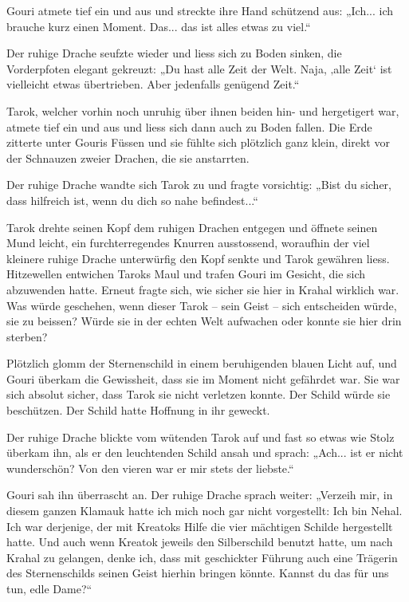 Gouri atmete tief ein und aus und streckte ihre Hand schützend aus: „Ich... ich brauche kurz einen Moment. Das... das ist alles etwas zu viel.“

Der ruhige Drache seufzte wieder und liess sich zu Boden sinken, die Vorderpfoten elegant gekreuzt: „Du hast alle Zeit der Welt. Naja, ‚alle Zeit‘ ist vielleicht etwas übertrieben. Aber jedenfalls genügend Zeit.“

Tarok, welcher vorhin noch unruhig über ihnen beiden hin- und hergetigert war, atmete tief ein und aus und liess sich dann auch zu Boden fallen. Die Erde zitterte unter Gouris Füssen und sie fühlte sich plötzlich ganz klein, direkt vor der Schnauzen zweier Drachen, die sie anstarrten.

Der ruhige Drache wandte sich Tarok zu und fragte vorsichtig: „Bist du sicher, dass hilfreich ist, wenn du dich so nahe befindest...“

Tarok drehte seinen Kopf dem ruhigen Drachen entgegen und öffnete seinen Mund leicht, ein furchterregendes Knurren ausstossend, woraufhin der viel kleinere ruhige Drache unterwürfig den Kopf senkte und Tarok gewähren liess. Hitzewellen entwichen Taroks Maul und trafen Gouri im Gesicht, die sich abzuwenden hatte. Erneut fragte sich, wie sicher sie hier in Krahal wirklich war. Was würde geschehen, wenn dieser Tarok – sein Geist – sich entscheiden würde, sie zu beissen? Würde sie in der echten Welt aufwachen oder konnte sie hier drin sterben?

Plötzlich glomm der Sternenschild in einem beruhigenden blauen Licht auf, und Gouri überkam die Gewissheit, dass sie im Moment nicht gefährdet war. Sie war sich absolut sicher, dass Tarok sie nicht verletzen konnte. Der Schild würde sie beschützen. Der Schild hatte Hoffnung in ihr geweckt.

Der ruhige Drache blickte vom wütenden Tarok auf und fast so etwas wie Stolz überkam ihn, als er den leuchtenden Schild ansah und sprach: „Ach... ist er nicht wunderschön? Von den vieren war er mir stets der liebste.“

 Gouri sah ihn überrascht an. Der ruhige Drache sprach weiter: „Verzeih mir, in diesem ganzen Klamauk hatte ich mich noch gar nicht vorgestellt: Ich bin Nehal. Ich war derjenige, der mit Kreatoks Hilfe die vier mächtigen Schilde hergestellt hatte. Und auch wenn Kreatok jeweils den Silberschild benutzt hatte, um nach Krahal zu gelangen, denke ich, dass mit geschickter Führung auch eine Trägerin des Sternenschilds seinen Geist hierhin bringen könnte. Kannst du das für uns tun, edle Dame?“

